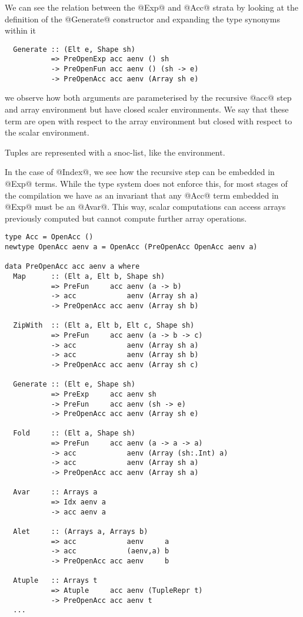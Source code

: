 We can see the relation between the @Exp@ and @Acc@ strata by looking at the definition of the @Generate@ constructor and expanding the type synonyms within it
%
\begin{lstlisting}
  Generate :: (Elt e, Shape sh)
           => PreOpenExp acc aenv () sh
           -> PreOpenFun acc aenv () (sh -> e)
           -> PreOpenAcc acc aenv (Array sh e)
\end{lstlisting}
%
we observe how both arguments are parameterised by the recursive @acc@ step and array environment but have closed scaler environments. We say that these term are open with respect to the array environment but closed with respect to the scalar environment.

Tuples are represented with a snoc-list, like the environment.

In the case of @Index@, we see how the recursive step can be embedded in @Exp@ terms. While the type system does not enforce this, for most stages of the compilation we have as an invariant that any @Acc@ term embedded in @Exp@ must be an @Avar@. This way, scalar computations can access arrays previously computed but cannot compute further array operations.


\begin{lstlisting}[label=lst:acc-ast, caption={The first-order abstract syntax of the \texttt{Acc} level of Accelerate.}, style=haskell]
type Acc = OpenAcc ()
newtype OpenAcc aenv a = OpenAcc (PreOpenAcc OpenAcc aenv a)

data PreOpenAcc acc aenv a where
  Map      :: (Elt a, Elt b, Shape sh)
           => PreFun     acc aenv (a -> b)
           -> acc            aenv (Array sh a)
           -> PreOpenAcc acc aenv (Array sh b)

  ZipWith  :: (Elt a, Elt b, Elt c, Shape sh)
           => PreFun     acc aenv (a -> b -> c)
           -> acc            aenv (Array sh a)
           -> acc            aenv (Array sh b)
           -> PreOpenAcc acc aenv (Array sh c)

  Generate :: (Elt e, Shape sh)
           => PreExp     acc aenv sh
           -> PreFun     acc aenv (sh -> e)
           -> PreOpenAcc acc aenv (Array sh e)

  Fold     :: (Elt a, Shape sh)
           => PreFun     acc aenv (a -> a -> a)
           -> acc            aenv (Array (sh:.Int) a)
           -> acc            aenv (Array sh a)
           -> PreOpenAcc acc aenv (Array sh a)

  Avar     :: Arrays a
           => Idx aenv a
           -> acc aenv a

  Alet     :: (Arrays a, Arrays b)
           => acc            aenv     a
           -> acc            (aenv,a) b
           -> PreOpenAcc acc aenv     b

  Atuple   :: Arrays t
           => Atuple     acc aenv (TupleRepr t)
           -> PreOpenAcc acc aenv t
  ...
\end{lstlisting}

